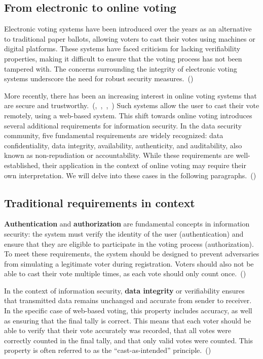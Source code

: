 \documentclass[a4paper,12pt,english]{article}
\begin{document}
\subsection{From electronic to online voting}\label{sec:requirements-online}

Electronic voting systems have been introduced over the years as an alternative to traditional paper ballots, allowing voters to cast their votes using machines or digital platforms. These systems have faced criticism for lacking verifiability properties, making it difficult to ensure that the voting process has not been tampered with. The concerns surrounding the integrity of electronic voting systems underscore the need for robust security measures.~(\cite{cryptoeprint:2016/287})

More recently, there has been an increasing interest in online voting systems that are secure and trustworthy.~(\cite{10.1145/2660267.2660315},~\cite{10.1007/978-3-030-51280-4_3},~\cite{263858},~\cite{halderman2015new}) Such systems allow the user to cast their vote remotely, using a web-based system. This shift towards online voting introduces several additional requirements for information security. In the data security community, five fundamental requirements are widely recognized: data confidentiality, data integrity, availability, authenticity, and auditability, also known as non-repudiation or accountability. While these requirements are well-established, their application in the context of online voting may require their own interpretation. We will delve into these cases in the following paragraphs.~(\cite{gerber-2001})

\subsection{Traditional requirements in context}\label{sec:requirements-context}

\textbf{Authentication} and \textbf{authorization} are fundamental concepts in information security: the system must verify the identity of the user (authentication) and ensure that they are eligible to participate in the voting process (authorization). To meet these requirements, the system should be designed to prevent adversaries from simulating a legitimate voter during registration. Voters should also not be able to cast their vote multiple times, as each vote should only count once.~(\cite{NAP25120})

In the context of information security, \textbf{data integrity} or verifiability ensures that transmitted data remains unchanged and accurate from sender to receiver. In the specific case of web-based voting, this property includes accuracy, as well as ensuring that the final tally is correct. This means that each voter should be able to verify that their vote accurately was recorded, that all votes were correctly counted in the final tally, and that only valid votes were counted. This property is often referred to as the ``cast-as-intended'' principle.~(\cite{4531164})
\end{document}
